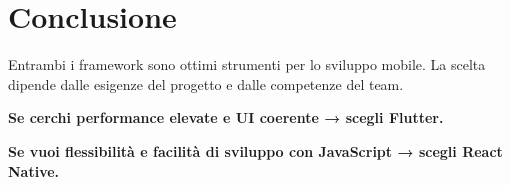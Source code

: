 \documentclass[a4paper,10pt]{article}
\begin{document}
\section{Conclusione}
Entrambi i framework sono ottimi strumenti per lo sviluppo mobile. La scelta dipende dalle esigenze del progetto e dalle competenze del team. 

\textbf{Se cerchi performance elevate e UI coerente → scegli Flutter.}

\textbf{Se vuoi flessibilità e facilità di sviluppo con JavaScript → scegli React Native.}
\end{document}
